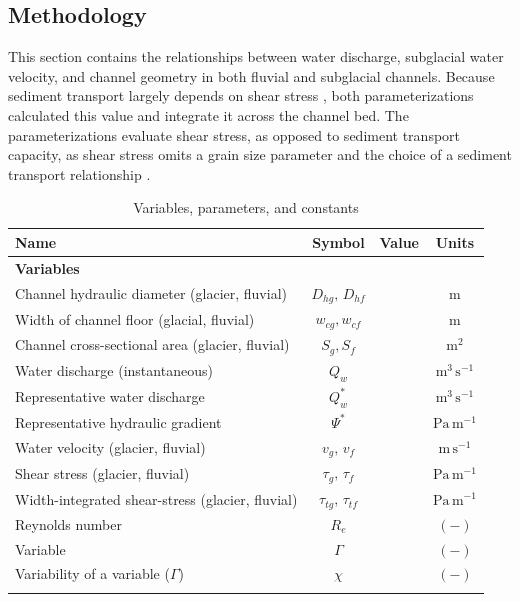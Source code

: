 \documentclass[11pt]{article}
\begin{document}
\begin{spacing}{1}
  \section{Methodology}
  \label{sect:meth}
  This section contains the relationships between water discharge, subglacial water velocity, and channel geometry in both fluvial and subglacial channels.
  Because sediment transport largely depends on shear stress \citep{shields1936}, both parameterizations calculated this value and integrate  it across the channel bed.
  The parameterizations evaluate shear stress, as opposed to sediment transport capacity, as shear stress omits a grain size parameter and the choice of a sediment transport relationship \citep{shields1936}.
  
  \begin{table}[H]
    \centering
    \caption{Variables, parameters, and constants }
    \begin{tabular}{ l  c  c c }
      Name &Symbol&  Value&Units \\ \hline
      \textbf{Variables}  & & & \\
      Channel hydraulic diameter (glacier, fluvial) &  $D_{hg},\,D_{hf}$&  & $\mathrm{m}$     \\
      Width of channel floor (glacial, fluvial) & $w_{cg},w_{cf}$&  & $\mathrm{m}$     \\
      Channel cross-sectional area (glacier, fluvial) &  $S_g, S_f$& & $\mathrm{m^2}$     \\
      Water discharge (instantaneous) & $Q_w$& & $\mathrm{m^{3}\,s^{-1}}$ \\
      Representative water discharge & $Q_{w}^*$& & $\mathrm{m^{3}\,s^{-1}}$ \\
      Representative hydraulic gradient  &$\Psi^*$ & & $\mathrm{Pa\, m^{-1}}$\\
      Water velocity (glacier, fluvial)  & $v_g,\,v_{f}$& & $\mathrm{m\,s^{-1}}$ \\
      Shear stress (glacier, fluvial) & $\tau_g,\,\tau_f$&& $\mathrm{Pa \, m^{-1}}$ \\
      Width-integrated shear-stress (glacier, fluvial) & $\tau_{tg},\, \tau_{tf}$&& $\mathrm{Pa \, m^{-1}}$ \\
      Reynolds number &$R_e$& & $\mathrm{(-)}$\\
      Variable &$\Gamma$&&$\mathrm{(-)}$\\
      Variability of a variable ($\Gamma$) &$\chi$& &$\mathrm{(-)}$\\
           &&&\\
      

\end{tabular}
\end{table}
\end{spacing}
\end{document}
